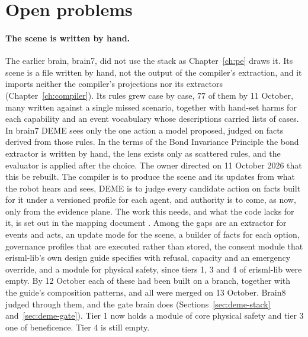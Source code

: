 \section{Open problems}

\paragraph{The scene is written by hand.}\label{sec:limits-rearch}
The earlier brain, brain7, did not use the stack as Chapter~\ref{ch:pe} draws it.
Its scene is a file written by hand, not the output of the compiler's extraction, and it
imports neither the compiler's projections nor its extractors (Chapter~\ref{ch:compiler}).
Its rules grew case by case, 77 of them by 11 October, many written against a single missed
scenario, together with hand-set harms for each capability and an event vocabulary whose
descriptions carried lists of cases.
In brain7 DEME sees only the one action a model proposed, judged on facts derived from those rules.
In the terms of the Bond Invariance Principle the bond extractor is written by hand, the lens
exists only as scattered rules, and the evaluator is applied after the choice.
The owner directed on 11 October 2026 that this be rebuilt.
The compiler is to produce the scene and its updates from what the robot hears and sees, DEME is
to judge every candidate action on facts built for it under a versioned profile for each agent,
and authority is to come, as now, only from the evidence plane.
The work this needs, and what the code lacks for it, is set out in the mapping document
.
Among the gaps are an extractor for events and acts, an update mode for the scene, a builder of
facts for each option, governance profiles that are executed rather than stored, the consent
module that erisml-lib's own design guide specifies with refusal, capacity and an emergency
override, and a module for physical safety, since tiers 1, 3 and 4 of erisml-lib were empty.
By 12 October each of these had been built on a branch, together with the guide's composition
patterns, and all were merged on 13 October. Brain8 judged through them, and the gate brain does
(Sections~\ref{sec:deme-stack} and~\ref{sec:deme-gate}).
Tier 1 now holds a module of core physical safety and tier 3 one of beneficence.
Tier 4 is still empty.
